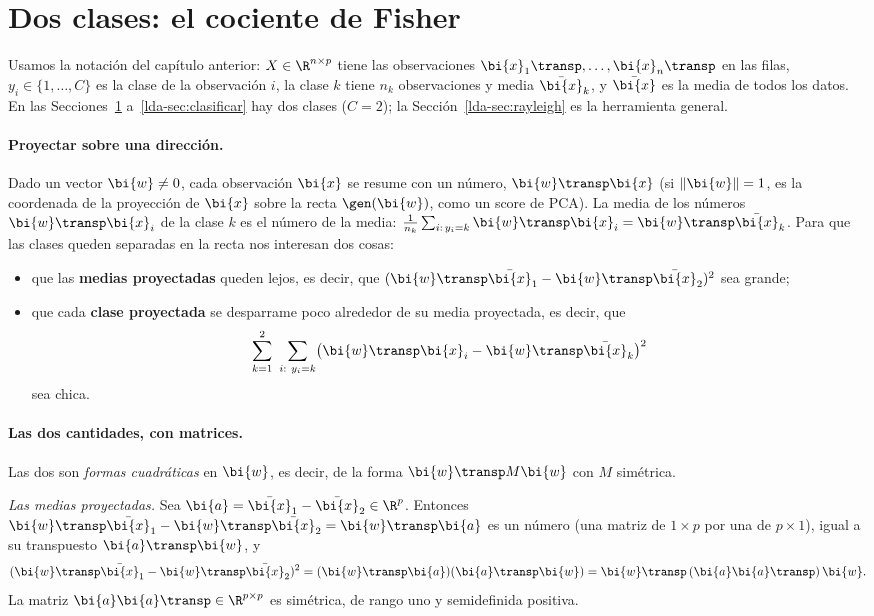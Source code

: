 \section{Dos clases: el cociente de Fisher}\label{lda-sec:fisher}

Usamos la notación del capítulo anterior: $X\in\R^{n\times p}$ tiene las
observaciones $\bi{x}_1\transp,\dots,\bi{x}_n\transp$ en las filas, $y_i\in\{1,\dots,C\}$
es la clase de la observación $i$, la clase $k$ tiene $n_k$ observaciones y
media $\bar{\bi{x}}_k$, y $\bar{\bi{x}}$ es la media de todos los datos. En las
Secciones~\ref{lda-sec:fisher} a~\ref{lda-sec:clasificar} hay dos clases
($C=2$); la Sección~\ref{lda-sec:rayleigh} es la herramienta general.

\paragraph{Proyectar sobre una dirección.} Dado un vector $\bi{w}\ne0$, cada
observación $\bi{x}$ se resume con un número, $\bi{w}\transp \bi{x}$ (si $\|\bi{w}\|=1$, es la
coordenada de la proyección de $\bi{x}$ sobre la recta $\gen(\bi{w})$, como un score de
PCA). La media de los números $\bi{w}\transp \bi{x}_i$ de la clase $k$ es el número de la
media: $\frac1{n_k}\sum_{i:\,y_i=k}\bi{w}\transp \bi{x}_i=\bi{w}\transp\bar{\bi{x}}_k$. Para que las
clases queden separadas en la recta nos interesan dos cosas:
\begin{itemize}[leftmargin=*,itemsep=1pt]
\item que las \textbf{medias proyectadas} queden lejos, es decir, que
$(\bi{w}\transp\bar{\bi{x}}_1-\bi{w}\transp\bar{\bi{x}}_2)^2$ sea grande;
\item que cada \textbf{clase proyectada} se desparrame poco alrededor de su
media proyectada, es decir, que
\[
\sum_{k=1}^{2}\ \sum_{i:\ y_i=k}\bigl(\bi{w}\transp \bi{x}_i-\bi{w}\transp\bar{\bi{x}}_k\bigr)^2
\]
sea chica.
\end{itemize}

\paragraph{Las dos cantidades, con matrices.} Las dos son \emph{formas
cuadráticas} en $\bi{w}$, es decir, de la forma $\bi{w}\transp M\bi{w}$ con $M$ simétrica.

\emph{Las medias proyectadas.} Sea $\bi{a}=\bar{\bi{x}}_1-\bar{\bi{x}}_2\in\R^p$. Entonces
$\bi{w}\transp\bar{\bi{x}}_1-\bi{w}\transp\bar{\bi{x}}_2=\bi{w}\transp \bi{a}$ es un número (una matriz de
$1\times p$ por una de $p\times1$), igual a su transpuesto $\bi{a}\transp \bi{w}$, y
\[
(\bi{w}\transp\bar{\bi{x}}_1-\bi{w}\transp\bar{\bi{x}}_2)^2=(\bi{w}\transp \bi{a})(\bi{a}\transp \bi{w})=\bi{w}\transp\,(\bi{a}\bi{a}\transp)\,\bi{w} .
\]
La matriz $\bi{a}\bi{a}\transp\in\R^{p\times p}$ es simétrica, de rango uno y
semidefinida positiva.

